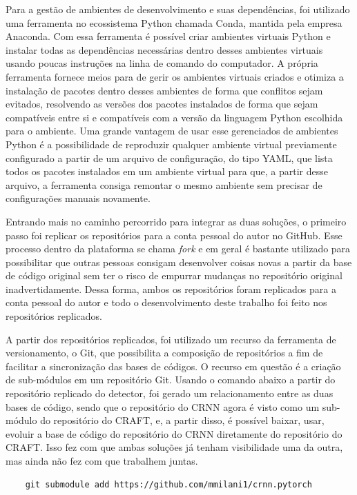 Para a gestão de ambientes de desenvolvimento e suas dependências, foi utilizado uma ferramenta no ecossistema Python chamada Conda, mantida pela empresa Anaconda. Com essa ferramenta é possível criar ambientes virtuais Python e instalar todas as dependências necessárias dentro desses ambientes virtuais usando poucas instruções na linha de comando do computador. A própria ferramenta fornece meios para de gerir os ambientes virtuais criados e otimiza a instalação de pacotes dentro desses ambientes de forma que conflitos sejam evitados, resolvendo as versões dos pacotes instalados de forma que sejam compatíveis entre si e compatíveis com a versão da linguagem Python escolhida para o ambiente. Uma grande vantagem de usar esse gerenciados de ambientes Python é a possibilidade de reproduzir qualquer ambiente virtual previamente configurado a partir de um arquivo de configuração, do tipo YAML, que lista todos os pacotes instalados em um ambiente virtual para que, a partir desse arquivo, a ferramenta consiga remontar o mesmo ambiente sem precisar de configurações manuais novamente.

Entrando mais no caminho percorrido para integrar as duas soluções, o primeiro passo foi replicar os repositórios para a conta pessoal do autor no GitHub. Esse processo dentro da plataforma se chama \textit{fork} e em geral é bastante utilizado para possibilitar que outras pessoas consigam desenvolver coisas novas a partir da base de código original sem ter o risco de empurrar mudanças no repositório original inadvertidamente. Dessa forma, ambos os repositórios foram replicados para a conta pessoal do autor e todo o desenvolvimento deste trabalho foi feito nos repositórios replicados.

A partir dos repositórios replicados, foi utilizado um recurso da ferramenta de versionamento, o Git, que possibilita a composição de repositórios a fim de facilitar a sincronização das bases de códigos. O recurso em questão é a criação de sub-módulos em um repositório Git. Usando o comando abaixo a partir do repositório replicado do detector, foi gerado um relacionamento entre as duas bases de código, sendo que o repositório do CRNN agora é visto como um sub-módulo do repositório do CRAFT, e, a partir disso, é possível baixar, usar, evoluir a base de código do repositório do CRNN diretamente do repositório do CRAFT. Isso fez com que ambas soluções já tenham visibilidade uma da outra, mas ainda não fez com que trabalhem juntas.

\begin{verbatim}
    git submodule add https://github.com/mmilani1/crnn.pytorch
\end{verbatim}

